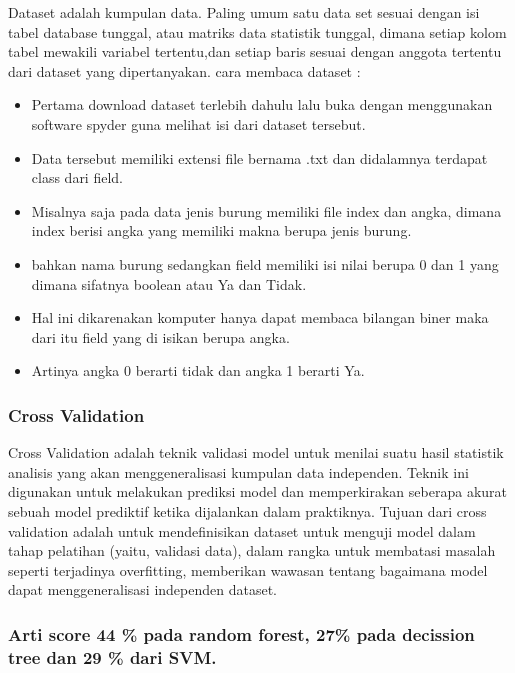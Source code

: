 \hfill\break
Dataset adalah kumpulan data. Paling umum satu data set sesuai dengan isi tabel database tunggal, atau matriks data statistik tunggal, dimana setiap kolom tabel mewakili variabel tertentu,dan setiap baris sesuai dengan anggota tertentu dari dataset yang dipertanyakan. cara membaca dataset :
\begin{itemize}
\item Pertama download dataset terlebih dahulu lalu buka dengan menggunakan software spyder guna melihat isi dari dataset tersebut.

\item Data tersebut memiliki extensi file bernama .txt dan didalamnya terdapat class dari field.

\item Misalnya saja pada data jenis burung memiliki file index dan angka, dimana index berisi angka yang memiliki makna berupa jenis burung.

\item bahkan nama burung sedangkan field memiliki isi nilai berupa 0 dan 1 yang dimana sifatnya boolean atau Ya dan Tidak.

\item Hal ini dikarenakan komputer hanya dapat membaca bilangan biner maka dari itu field yang di isikan berupa angka.

\item Artinya angka 0 berarti tidak dan angka 1 berarti Ya.
\end{itemize}

\subsubsection{Cross Validation}

\hfill\break
Cross Validation adalah teknik validasi model untuk menilai suatu hasil statistik analisis yang akan menggeneralisasi kumpulan data independen. Teknik ini digunakan untuk melakukan prediksi model dan memperkirakan seberapa akurat sebuah model prediktif ketika dijalankan dalam praktiknya. Tujuan dari cross validation adalah untuk mendefinisikan dataset untuk menguji model dalam tahap pelatihan (yaitu, validasi data), dalam rangka untuk membatasi masalah seperti terjadinya overfitting, memberikan wawasan tentang bagaimana model dapat menggeneralisasi independen dataset.
\subsubsection{Arti score 44 \% pada random forest, 27\% pada decission tree dan 29 \% dari SVM.}

